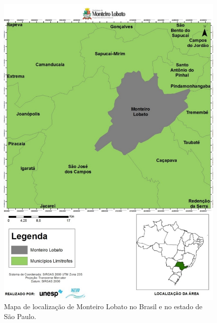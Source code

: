\clearpage
\begin{figure}[hbt!]
	\centering
	\includegraphics[width=0.9\linewidth]{produtos/proddois/image008}
	\caption{Mapa de localização de Monteiro Lobato no Brasil e no estado de São Paulo. }
	\label{fig:image008}
\end{figure}

